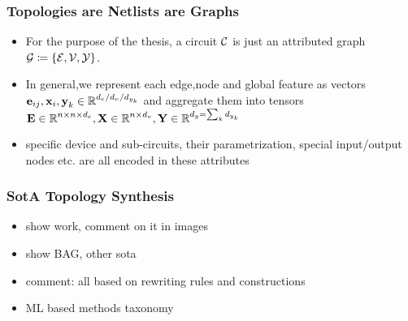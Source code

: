 \documentclass[./presentation.tex]{subfiles}
\begin{document}
\begin{frame}[label=working]
  \frametitle{Topologies are Netlists are Graphs}
  \begin{itemize}
    \item For the purpose of the thesis, a circuit $\operatorname{\mathcal{C}}$ is just an attributed graph ${\mathcal{G}}\coloneq \lbrace{\mathcal{E}},{\mathcal{V}},{\mathcal{Y}} \rbrace$.
    \item In general,we represent each edge,node and global feature as vectors $\operatorname{\mathbf{e}}_{ij},\operatorname{\mathbf{x}}_i,\operatorname{\mathbf{y}}_k \in \operatorname{\mathbb{R}}^{d_e/d_v/d_{y_k}}$ and aggregate them into tensors $\operatorname{\mathbf{E}}\in\operatorname{\mathbb{R}}^{n\times n \times d_e},\operatorname{\mathbf{X}}\in\operatorname{\mathbb{R}}^{n\times d_v},\operatorname{\mathbf{Y}}\in\operatorname{\mathbb{R}}^{d_y=\sum_k d_{y_k}}$
    \item specific device and sub-circuits, their parametrization, special input/output nodes etc. are all encoded in these attributes
  \end{itemize}
\end{frame}

\begin{frame}[label=working]
\frametitle{SotA Topology Synthesis}
\begin{itemize}
  \item show \cite{zhaoAutomatedTopologySynthesis2022a} work, comment on it in images
  \item show BAG, other sota
  \item comment: all based on rewriting rules and constructions
  \item ML based methods taxonomy
\end{itemize}
\end{frame}

  
\end{document}
